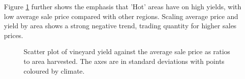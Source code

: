 \documentclass[review,12pt,authoryear]{elsarticle}
\begin{document}
\begin{linenumbers}
Figure \ref{fig:yield_vs_value_area} further shows the emphasis that 'Hot' areas have on high yields, with low average sale price compared with other regions. Scaling average price and yield by area shows a strong negative trend, trading quantity for higher sales prices.
\par
\begin{figure}
    \caption{Scatter plot of vineyard yield against the average sale price as ratios to area harvested. The axes are in standard deviations with points coloured by climate.}\label{fig:yield_vs_value_area}
\end{figure}


\end{linenumbers}
\end{document}
